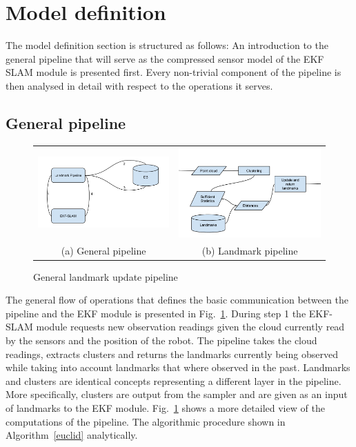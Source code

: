 \documentclass[twoside,hidelinks]{article}
\begin{document}
\newpage
\section{Model definition}
\label{sec:model}

The model definition section is structured as follows: An introduction to the general pipeline that will serve as the compressed sensor model of the EKF SLAM module is presented first. Every non-trivial component of the pipeline is then analysed in detail with respect to the operations it serves.

\subsection{General pipeline}

\begin{figure}
\begin{tabular}{cc}
  \includegraphics[width=.33\textwidth]{workflowGen} &    \includegraphics[width=.33\textwidth]{workflowSpec} \\
(a) General pipeline & (b) Landmark pipeline \\[6pt]
\end{tabular}
\caption{General landmark update pipeline}
\label{pipeline}
\end{figure}


The general flow of operations that defines the basic communication between the pipeline and the EKF module is presented in Fig.~\ref{pipeline}. During step 1 the EKF-SLAM module requests new observation readings given the cloud currently read by the sensors and the position of the robot. The pipeline takes the cloud readings, extracts clusters and returns the landmarks currently being observed while taking into account landmarks that where observed in the past. Landmarks and clusters are identical concepts representing a different layer in the pipeline. More specifically, clusters are output from the sampler and are given as an input of landmarks to the EKF module. Fig.~\ref{pipeline} shows a more detailed view of the computations of the pipeline. The algorithmic procedure shown in Algorithm~\ref{euclid} analytically.
\end{document}

